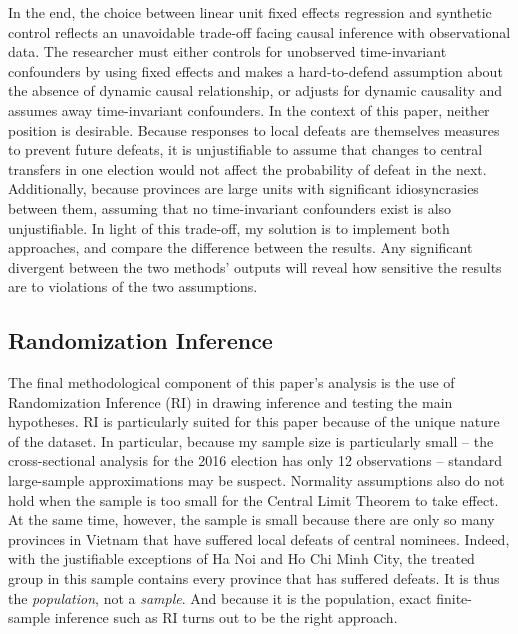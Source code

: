 \documentclass[12pt]{article}\usepackage[]{graphicx}\usepackage[]{color}
\newcommand{\1}{\mathbbm{1}}
\begin{document}
In the end, the choice between linear unit fixed effects regression and synthetic control reflects an unavoidable trade-off facing causal inference with observational data. The researcher must either controls for unobserved time-invariant confounders by using fixed effects and makes a hard-to-defend assumption about the absence of dynamic causal relationship, or adjusts for dynamic causality and assumes away time-invariant confounders. In the context of this paper, neither position is desirable. Because responses to local defeats are themselves measures to prevent future defeats, it is unjustifiable to assume that changes to central transfers in one election would not affect the probability of defeat in the next. Additionally, because provinces are large units with significant idiosyncrasies between them, assuming that no time-invariant confounders exist is also unjustifiable. In light of this trade-off, my solution is to implement both approaches, and compare the difference between the results. Any significant divergent between the two methods' outputs will reveal how sensitive the results are to violations of the two assumptions.

\subsection{Randomization Inference}

The final methodological component of this paper's analysis is the use of Randomization Inference (RI) in drawing inference and testing the main hypotheses. RI is particularly suited for this paper because of the unique nature of the dataset. In particular, because my sample size is particularly small -- the cross-sectional analysis for the 2016 election has only 12 observations -- standard large-sample approximations may be suspect. Normality assumptions also do not hold when the sample is too small for the Central Limit Theorem to take effect. At the same time, however, the sample is small because there are only so many provinces in Vietnam that have suffered local defeats of central nominees. Indeed, with the justifiable exceptions of Ha Noi and Ho Chi Minh City, the treated group in this sample contains every province that has suffered defeats. It is thus the \textit{population}, not a \textit{sample}. And because it is the population, exact finite-sample inference such as RI turns out to be the right approach. 

\end{document}
